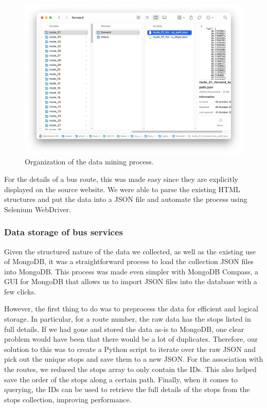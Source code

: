 \begin{figure}
    \centering
    \includegraphics[width=\textwidth]{assets/images/Implementation/data_org.png}
    \caption{Organization of the data mining process.}
    \label{fig:data_org}
\end{figure}

For the details of a bus route, this was made easy since they are explicitly displayed on the source website. We were able to parse the existing HTML structures and put the data into a JSON file and automate the process using Selenium WebDriver.

\subsubsection{Data storage of bus services}
Given the structured nature of the data we collected, as well as the existing use of MongoDB, it was a straightforward process to load the collection JSON files into MongoDB. This process was made even simpler with MongoDB Compass, a GUI for MongoDB that allows us to import JSON files into the database with a few clicks.

However, the first thing to do was to preprocess the data for efficient and logical storage. In particular, for a route number, the raw data has the stops listed in full details. If we had gone and stored the data as-is to MongoDB, one clear problem would have been that there would be a lot of duplicates. Therefore, our solution to this was to create a Python script to iterate over the raw JSON and pick out the unique stops and save them to a new JSON. For the association with the routes, we reduced the stops array to only contain the IDs. This also helped save the order of the stops along a certain path. Finally, when it comes to querying, the IDs can be used to retrieve the full details of the stops from the stops collection, improving performance.

